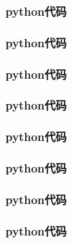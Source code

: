 \documentclass{cumcmthesis} %
\begin{document}
\begin{appendices}
    \subsubsection*{python代码}
    
    
    \subsubsection*{python代码}
    
    
    \subsubsection*{python代码}
    
    
    \subsubsection*{python代码}
    
    
    \subsubsection*{python代码}
    
    
    \subsubsection*{python代码}
    
    
    \subsubsection*{python代码}
    
    
    \subsubsection*{python代码}
    


\end{appendices}
\end{document}
